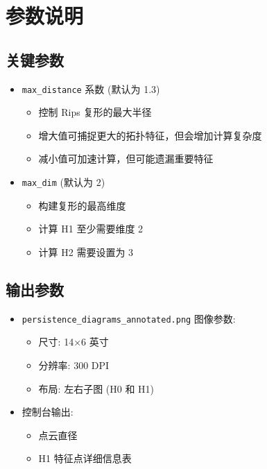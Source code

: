 \documentclass[a4paper]{article}
\begin{document}
\section{参数说明}

\subsection{关键参数}
\begin{itemize}
    \item \texttt{max\_distance} 系数 (默认为 1.3)
    
    \begin{itemize}
        \item 控制 Rips 复形的最大半径
        \item 增大值可捕捉更大的拓扑特征，但会增加计算复杂度
        \item 减小值可加速计算，但可能遗漏重要特征
    \end{itemize}

    \item \texttt{max\_dim} (默认为 2)
    
    \begin{itemize}
        \item 构建复形的最高维度
        \item 计算 H1 至少需要维度 2
        \item 计算 H2 需要设置为 3
    \end{itemize}
\end{itemize}

\subsection{输出参数}
\begin{itemize}
    \item \texttt{persistence\_diagrams\_annotated.png} 图像参数:
    \begin{itemize}
        \item 尺寸: 14×6 英寸
        \item 分辨率: 300 DPI
        \item 布局: 左右子图 (H0 和 H1)
    \end{itemize}
    \item 控制台输出:
    \begin{itemize}
        \item 点云直径
        \item H1 特征点详细信息表
    \end{itemize}
\end{itemize}
\end{document}
